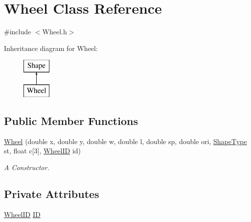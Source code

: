 \hypertarget{classWheel}{\section{Wheel Class Reference}
\label{classWheel}
}


{\ttfamily \#include $<$Wheel.\-h$>$}

Inheritance diagram for Wheel\-:\begin{figure}[H]
\begin{center}
\leavevmode
\includegraphics[height=2.000000cm]{classWheel}
\end{center}
\end{figure}
\subsection*{Public Member Functions}
\begin{DoxyCompactItemize}
\item 
\hyperlink{classWheel_a04a73ee48ea5d68a595aefdae58c2c03}{Wheel} (double x, double y, double w, double l, double sp, double ori, \hyperlink{Shape_8h_a5a4538eeab397888d88a4eefcc5a1345}{Shape\-Type} st, float c\mbox{[}3\mbox{]}, \hyperlink{Sensor_8h_a231524b302f9d7e6dd216fa89296f844}{Wheel\-I\-D} id)
\begin{DoxyCompactList}\small\item\em A Constructor. \end{DoxyCompactList}\end{DoxyCompactItemize}
\subsection*{Private Attributes}
\begin{DoxyCompactItemize}
\item 
\hyperlink{Sensor_8h_a231524b302f9d7e6dd216fa89296f844}{Wheel\-I\-D} \hyperlink{classWheel_aea86817285acade58673eaa82782ce7a}{I\-D}
\end{DoxyCompactItemize}


